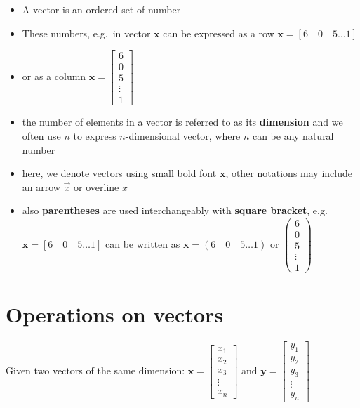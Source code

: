 \documentclass[
]{book}
\providecommand{\tightlist}{%
  \setlength{\itemsep}{0pt}\setlength{\parskip}{0pt}}
\theoremstyle{definition}
\theoremstyle{definition}
\theoremstyle{definition}
\theoremstyle{remark}
\begin{document}
\begin{itemize}
\tightlist
\item
  A vector is an ordered set of number
\item
  These numbers, e.g.~in vector \(\mathbf{x}\) can be expressed as a row \(\mathbf{x}=[6\quad 0\quad 5 \dots1]\)
\item
  or as a column \(\mathbf{x}=\begin{bmatrix} 6 \\ 0 \\ 5 \\ \vdots \\ 1 \end{bmatrix}\)
\item
  the number of elements in a vector is referred to as its \textbf{dimension} and we often use \(n\) to express \(n\)-dimensional vector, where \(n\) can be any natural number
\item
  here, we denote vectors using small bold font \(\mathbf{x}\), other notations may include an arrow \(\vec x\) or overline \(\overline{x}\)
\item
  also \textbf{parentheses} are used interchangeably with \textbf{square bracket}, e.g.~\(\mathbf{x}=[6\quad 0\quad 5 \dots1]\) can be written as \(\mathbf{x}=(6\quad 0\quad 5 \dots1)\) or \(\begin{pmatrix} 6\\ 0\\ 5\\ \vdots \\ 1 \end{pmatrix}\)
\end{itemize}

\hypertarget{operations-on-vectors}{%
\section{Operations on vectors}\label{operations-on-vectors}}

Given two vectors of the same dimension:
\(\mathbf{x}=\begin{bmatrix}  x_1 \\  x_2 \\  x_3 \\  \vdots \\  x_n \end{bmatrix}\)
and
\(\mathbf{y}=\begin{bmatrix}  y_1 \\  y_2 \\  y_3 \\  \vdots \\  y_n \end{bmatrix}\)
\end{document}
